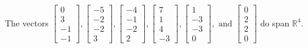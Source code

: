 \begin{exercise}
\begin{exerciseStatement}
  \end{exerciseStatement}
  \begin{exerciseAnswer}
   The vectors \(\left[\begin{array}{r}
0 \\
3 \\
-1 \\
-1
\end{array}\right] , \left[\begin{array}{r}
-5 \\
-2 \\
-2 \\
3
\end{array}\right] , \left[\begin{array}{r}
-4 \\
-1 \\
-2 \\
2
\end{array}\right] , \left[\begin{array}{r}
7 \\
1 \\
4 \\
-3
\end{array}\right] , \left[\begin{array}{r}
1 \\
-3 \\
-3 \\
0
\end{array}\right] , \text{ and } \left[\begin{array}{r}
0 \\
2 \\
2 \\
0
\end{array}\right]\) 
  	 do  
	span \(\mathbb{R}^4\).
  


  \end{exerciseAnswer}
\end{exercise}